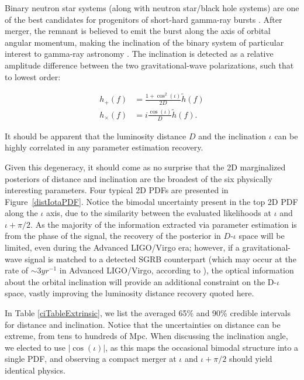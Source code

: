 \documentclass[11pt,a4paper]{emulateapj} 
\newcommand{\carl}[1]{{\color{red} #1}}
\begin{document}
Binary neutron star systems (along with neutron star/black hole
systems) are one of the best candidates for progenitors of short-hard
gamma-ray bursts \citep[and references therein]{Nakar2007}.  After
merger, the remnant is believed to emit the burst along the axis of
orbital angular momentum, making the inclination of the binary system
of particular interest to gamma-ray astronomy
\citep{LSCGRB2010,Corsi2012}.  The inclination is detected as a
relative amplitude difference between the two gravitational-wave
polarizations, such that to lowest order:

\begin{align}
h_+(f) &= \frac{1+\cos^2(\iota)}{2 D} \tilde{h}(f) \nonumber
\\ h_\times(f) &= i \frac{\cos(\iota)}{D}\tilde{h}(f) .
\end{align}

\noindent It should be apparent that the luminosity distance $D$ and
the inclination $\iota$ can be highly correlated in any parameter
estimation recovery.

Given this degeneracy, it should come as no surprise that the 2D
marginalized posteriors of distance and inclination are the broadest
of the six physically interesting parameters.  Four typical 2D PDFs
are presented in Figure~\ref{distIotaPDF}.  Notice the bimodal
uncertainty present in the top 2D PDF along the $\iota$ axis, due to
the similarity between the evaluated likelihoods at $\iota$ and $\iota
+ \pi/2$.  As the majority of the information extracted via parameter
estimation is from the phase of the signal, the recovery of the
posterior in $D$-$\iota$ space will be limited, even during the
Advanced LIGO/Virgo era; however, if a gravitational-wave signal is
matched to a detected SGRB counterpart (which may occur at the rate of
$\sim 3 yr^{-1}$ in Advanced LIGO/Virgo, according to
\cite{Metzger2013}), the optical information about the orbital
inclination will provide an additional constraint on the D-$\iota$
space, vastly improving the luminosity distance recovery quoted here.
 
 
In Table \ref{ciTableExtrinsic}, we list the averaged 65\% and 90\% credible
intervals for distance and inclination.  Notice that the uncertainties
on distance can be extreme, from tens to hundreds of Mpc.  When
discussing the inclination angle, we elected to use $|\cos(\iota)|$,
as this maps the occasional bimodal structure into a single PDF, and
observing a compact merger at $\iota$ and $\iota + \pi/2$ should yield
identical physics.
\end{document}
